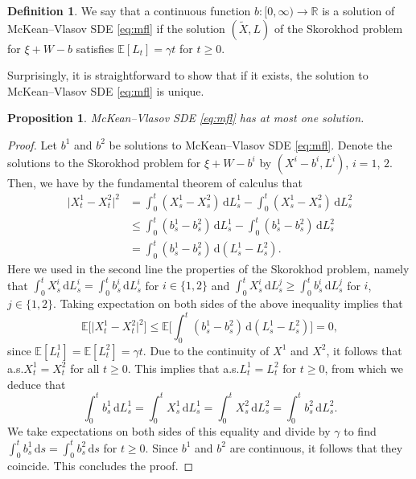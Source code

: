 \documentclass[11pt, a4paper]{article}
\theoremstyle{plain}
\newtheorem{proposition}[theorem]{Proposition}
\theoremstyle{definition}
\newtheorem{definition}[theorem]{Definition}
\theoremstyle{remark}
\numberwithin{equation}{section}
\newcommand{\ev}{\mathbb{E}}
\newcommand{\R}{\mathbb{R}}
\renewcommand{\d}{\mathrm{d}}
\newcommand{\define}{\mathpunct{:}}
\begin{document}
\begin{definition} \label{def:solution_strong}
We say that a continuous function $b \define [0, \infty) \to \R$ is a solution of McKean--Vlasov SDE \eqref{eq:mfl} if the solution $(\tilde{X}, L)$ of the Skorokhod problem for $\xi + W - b$ satisfies $\ev[L_t] = \gamma t$ for $t \geq 0$.
\end{definition}

Surprisingly, it is straightforward to show that if it exists, the solution to McKean--Vlasov SDE \eqref{eq:mfl} is unique.

\begin{proposition} \label{prop:mfl_strong_uniqueness}
McKean--Vlasov SDE \eqref{eq:mfl} has at most one solution.
\end{proposition}

\begin{proof}
Let $b^1$ and $b^2$ be solutions to McKean--Vlasov SDE \eqref{eq:mfl}. Denote the solutions to the Skorokhod problem for $\xi + W - b^i$ by $(X^i - b^i, L^i)$, $i = 1$, $2$. Then, we have by the fundamental theorem of calculus that
\begin{align*}
    \lvert X^1_t - X^2_t\rvert^2 &= \int_0^t (X^1_s  - X^2_s) \, \d L^1_s - \int_0^t (X^1_s  - X^2_s) \, \d L^2_s \\
    &\leq \int_0^t (b^1_s  - b^2_s) \, \d L^1_s - \int_0^t (b^1_s  - b^2_s) \, \d L^2_s \\
    &= \int_0^t (b^1_s  - b^2_s) \, \d (L^1_s - L^2_s).
\end{align*}
Here we used in the second line the properties of the Skorokhod problem, namely that $\int_0^t X^i_s \, \d L^i_s = \int_0^t b^i_s \, \d L^i_s$ for $i \in \{1, 2\}$ and $\int_0^t X^i_s \, \d L^j_s \geq \int_0^t b^i_s \, \d L^j_s$ for $i$, $j \in \{1, 2\}$. Taking expectation on both sides of the above inequality implies that
\begin{equation*}
    \ev\bigl[\lvert X^1_t - X^2_t\rvert^2\bigr] \leq \ev\biggl[\int_0^t (b^1_s  - b^2_s) \, \d (L^1_s - L^2_s)\biggr] = 0,
\end{equation*}
since $\ev[L^1_t] = \ev[L^2_t] = \gamma t$. Due to the continuity of $X^1$ and $X^2$, it follows that a.s.\@ $X^1_t = X^2_t$ for all $t \geq 0$. This implies that a.s.\@ $L^1_t = L^2_t$ for $t \geq 0$, from which we deduce that
\begin{equation*}
    \int_0^t b^1_s \, \d L^1_s = \int_0^t X^1_s \, \d L^1_s = \int_0^t X^2_s \, \d L^2_s = \int_0^t b^2_s \, \d L^2_s.
\end{equation*}
We take expectations on both sides of this equality and divide by $\gamma$ to find $\int_0^t b^1_s \, \d s = \int_0^t b^2_s \, \d s$ for $t \geq 0$. Since $b^1$ and $b^2$ are continuous, it follows that they coincide. This concludes the proof.
\end{proof}
\end{document}

